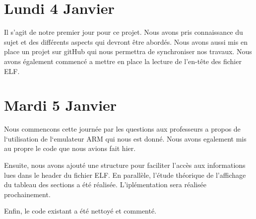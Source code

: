\documentclass[12pt, a4paper]{article}
\begin{document}
\section{Lundi 4 Janvier}

Il s'agit de notre premier jour pour ce projet. Nous avons pris 
connaissance du sujet et des différents aspects qui devront être 
abordés. Nous avons aussi mis en place un projet sur gitHub qui nous 
permettra de synchroniser nos travaux. Nous avons également 
commencé a mettre en place la lecture de l'en-t\^ete des fichier 
ELF.

\section{Mardi 5 Janvier}

Nous commencons cette journée par les questions aux professeurs a propos de 
l`utilisation de l`emulateur ARM qui nous est donn\'e. Nous avons egalement 
mis au propre le code que nous avions fait hier.

Ensuite, nous avons ajouté une structure pour faciliter l'accès aux informations lues dans le header du fichier ELF.
En parallèle, l'étude théorique de l'affichage du tableau des sections a été réalisée. L'iplémentation sera réalisée prochainement.

Enfin, le code existant a été nettoyé et commenté.
\end{document}
